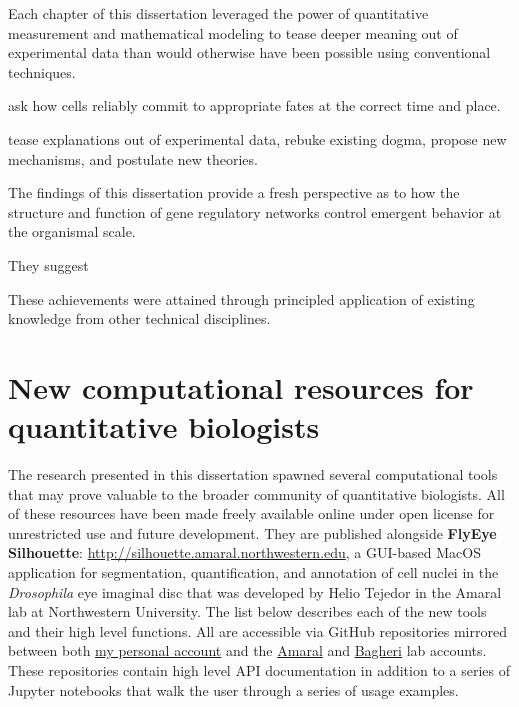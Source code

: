 Each chapter of this dissertation leveraged the power of quantitative measurement and mathematical modeling to tease deeper meaning out of experimental data than would otherwise have been possible using conventional techniques.

ask how cells reliably commit to appropriate fates at the correct time and place.

tease explanations out of experimental data, rebuke existing dogma, propose new mechanisms, and postulate new theories. 

The findings of this dissertation provide a fresh perspective as to how the structure and function of gene regulatory networks control emergent behavior at the organismal scale.

They suggest 

These achievements were attained through principled application of existing knowledge from other technical disciplines.







\section{New computational resources for quantitative biologists}

The research presented in this dissertation spawned several computational tools that may prove valuable to the broader community of quantitative biologists. All of these resources have been made freely available online under open license for unrestricted use and future development. They are published alongside \textbf{FlyEye Silhouette}: \url{http://silhouette.amaral.northwestern.edu}, a GUI-based MacOS application for segmentation, quantification, and annotation of cell nuclei in the \textit{Drosophila} eye imaginal disc that was developed by Helio Tejedor in the Amaral lab at Northwestern University. The list below describes each of the new tools and their high level functions. All are accessible via GitHub repositories mirrored between both \href{https://github.com/sebastianbernasek/}{my personal account} and the \href{https://github.com/amarallab}{Amaral} and \href{https://github.com/bagherilab}{Bagheri} lab accounts. These repositories contain high level API documentation in addition to a series of Jupyter notebooks that walk the user through a series of usage examples. 

